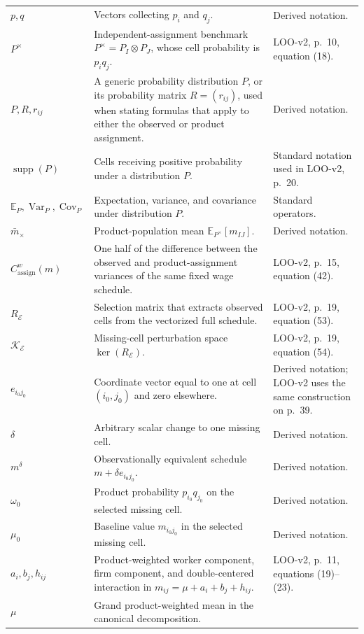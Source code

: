 \documentclass[11pt]{article}
\begin{document}
\begin{longtable}{p{}p{}p{}}
\(p,q\) & Vectors collecting \(p_i\) and \(q_j\). & Derived notation. \\
\(P^\times\) & Independent-assignment benchmark
\(P^\times=P_I\otimes P_J\), whose cell probability is \(p_iq_j\). &
LOO-v2, p.\ 10, equation (18). \\
\(P,R,r_{ij}\) & A generic probability distribution \(P\), or its probability
matrix \(R=(r_{ij})\), used when stating formulas that apply to either the
observed or product assignment. & Derived notation. \\
\(\operatorname{supp}(P)\) & Cells receiving positive probability under a
distribution \(P\). & Standard notation used in LOO-v2, p.\ 20. \\
\(\mathbb E_P,\operatorname{Var}_P,\operatorname{Cov}_P\) & Expectation,
variance, and covariance under distribution \(P\). & Standard operators. \\
\(\bar m_\times\) & Product-population mean
\(\mathbb E_{P^\times}[m_{IJ}]\). & Derived notation. \\
\(C^w_{\mathrm{assign}}(m)\) & One half of the difference between the observed
and product-assignment variances of the same fixed wage schedule. &
LOO-v2, p.\ 15, equation (42). \\
\(R_{\mathcal E}\) & Selection matrix that extracts observed cells from the
vectorized full schedule. & LOO-v2, p.\ 19, equation (53). \\
\(\mathcal K_{\mathcal E}\) & Missing-cell perturbation space
\(\ker(R_{\mathcal E})\). & LOO-v2, p.\ 19, equation (54). \\
\(e_{i_0j_0}\) & Coordinate vector equal to one at cell \((i_0,j_0)\) and zero
elsewhere. & Derived notation; LOO-v2 uses the same construction on p.\ 39. \\
\(\delta\) & Arbitrary scalar change to one missing cell. & Derived notation. \\
\(m^\delta\) & Observationally equivalent schedule
\(m+\delta e_{i_0j_0}\). & Derived notation. \\
\(\omega_0\) & Product probability \(p_{i_0}q_{j_0}\) on the selected missing
cell. & Derived notation. \\
\(\mu_0\) & Baseline value \(m_{i_0j_0}\) in the selected missing cell. &
Derived notation. \\
\(a_i,b_j,h_{ij}\) & Product-weighted worker component, firm component, and
double-centered interaction in
\(m_{ij}=\mu+a_i+b_j+h_{ij}\). & LOO-v2, p.\ 11, equations (19)--(23). \\
\(\mu\) & Grand product-weighted mean in the canonical decomposition. &

\end{longtable}
\end{document}
